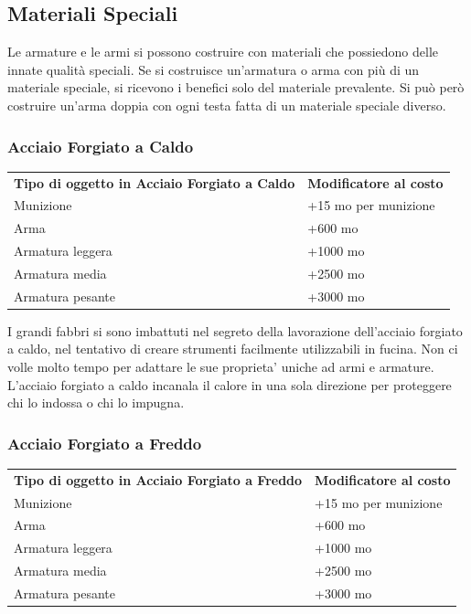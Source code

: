 \documentclass[a4paper,11pt,twoside,openany]{book}
\begin{document}
\pagebreak

\subsection{Materiali Speciali}

Le armature e le armi si possono costruire con materiali che possiedono delle innate qualità speciali. Se si costruisce un'armatura o arma con più di un materiale speciale, si ricevono i benefici solo del materiale prevalente. Si può però costruire un'arma doppia con ogni testa fatta di un materiale speciale diverso.

\subsubsection{Acciaio Forgiato a Caldo}

\label{acciaio-forgiato-a-caldo}

\begin{tabular}{ll}
	\toprule
	\textbf{Tipo di oggetto in Acciaio Forgiato a Caldo} & \textbf{Modificatore al costo}\tabularnewline
	Munizione			& +15 mo per munizione\tabularnewline
	Arma				& +600 mo\tabularnewline
	Armatura leggera    & +1000 mo\tabularnewline
	Armatura media      & +2500 mo\tabularnewline
	Armatura pesante    & +3000 mo\tabularnewline
\end{tabular}

I grandi fabbri si sono imbattuti nel segreto della lavorazione dell'acciaio
forgiato a caldo, nel tentativo di creare strumenti facilmente utilizzabili
in fucina. Non ci volle molto tempo per adattare le sue proprieta'
uniche ad armi e armature. L'acciaio forgiato a caldo incanala il
calore in una sola direzione per proteggere chi lo indossa o chi lo
impugna.

\subsubsection{Acciaio Forgiato a Freddo}

\label{acciaio-forgiato-a-freddo}

\begin{tabular}{ll}
	\toprule
	\textbf{Tipo di oggetto in Acciaio Forgiato a Freddo} & \textbf{Modificatore al costo}\tabularnewline
	Munizione               & +15 mo per munizione\tabularnewline
	Arma                    & +600 mo\tabularnewline
	Armatura leggera        & +1000 mo\tabularnewline
	Armatura media          & +2500 mo\tabularnewline
	Armatura pesante        & +3000 mo\tabularnewline
\end{tabular}
\end{document}
